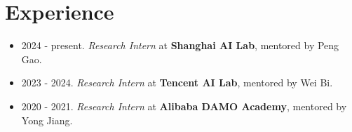 \documentclass[a4paper,12pt]{article}
\begin{document}
\section{Experience}
\begin{itemize}[leftmargin=18pt]
      \item 2024 - present. \emph{Research Intern} at \textbf{Shanghai AI Lab}, mentored by Peng Gao.
      \item 2023 - 2024. \emph{Research Intern} at \textbf{Tencent AI Lab}, mentored by Wei Bi.
      \item 2020 - 2021. \emph{Research Intern} at \textbf{Alibaba DAMO Academy}, mentored by Yong Jiang.
\end{itemize}
\end{document}
